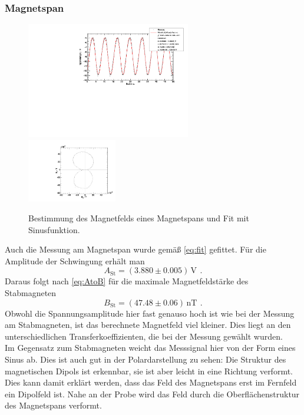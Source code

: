 \subsubsection{Magnetspan}
\begin{figure}[H]
\begin{center}
  \includegraphics[width=0.64\textwidth]{../img/fit_Magnetspan_45grad.pdf}
  \includegraphics[width=0.35\textwidth]{../img/polar_Magnetspan_45grad.pdf}
  \caption{Bestimmung des Magnetfelds eines Magnetspans und Fit mit Sinusfunktion.}
  \label{img:magnetspan}
\end{center}
\end{figure}
Auch die Messung am Magnetspan wurde gemäß \autoref{eq:fit} gefittet.
Für die Amplitude der Schwingung erhält man
\begin{equation}
A_{\text{St}}=(3.880 \pm 0.005)\, \text{V} \ \, .
\end{equation}
Daraus folgt nach \autoref{eq:AtoB} für die maximale Magnetfeldstärke des Stabmagneten
\begin{equation}
B_{\text{St}} = (47.48 \pm 0.06)\,\text{nT} \ \, .
\end{equation}
Obwohl die Spannungsamplitude hier fast genauso hoch ist wie bei der Messung am Stabmagneten,
ist das berechnete Magnetfeld viel kleiner. Dies liegt an den unterschiedlichen Transferkoeffizienten,
die bei der Messung gewählt wurden.\\ 
Im Gegensatz zum Stabmagneten weicht das Messsignal hier von der Form eines Sinus ab.
Dies ist auch gut in der Polardarstellung zu sehen:
Die Struktur des magnetischen Dipols ist erkennbar, sie ist aber leicht in eine Richtung verformt.
Dies kann damit erklärt werden, dass das Feld des Magnetspans erst im Fernfeld ein Dipolfeld ist.
Nahe an der Probe wird das Feld durch die Oberflächenstruktur des Magnetspans verformt.

